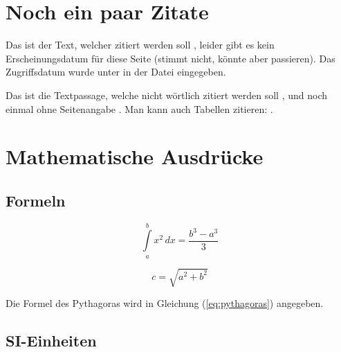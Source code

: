\newpage
{}


\section{Noch ein paar Zitate}



Das ist der Text, welcher zitiert werden soll  \autocite{HTL-Kaindorf-2},
leider gibt es kein Erscheinungsdatum für diese Seite (stimmt nicht, könnte aber passieren). Das Zugriffsdatum wurde unter  in der Datei  eingegeben.

\begin{longcite}
	 \autocite[F9]{Boege2011}
\end{longcite}

Das ist die Textpassage, welche nicht wörtlich zitiert werden soll \autocite[vgl.][399]{einstein}, und noch einmal ohne Seitenangabe \autocite[vgl.][]{einstein}.
Man kann auch Tabellen zitieren: \autocite[vgl.][Tab. 2]{einstein}.

\autocite[Tab. 8.1]{Decker2018}

\section{Mathematische Ausdrücke}
\subsection{Formeln}
\begin{equation}
	\label{eq:1}
	\int\limits_{a}^{b} x^{2} \, dx = \frac{ b^{3} - a^{3} }{3}
\end{equation}

\begin{equation}
	\label{eq:pythagoras}
	c = \sqrt{ a^{2} + b^{2} }
\end{equation}

Die Formel des Pythagoras wird in Gleichung (\ref{eq:pythagoras}) angegeben.

\subsection{SI-Einheiten}

